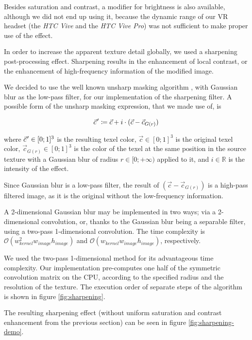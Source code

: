 Besides saturation and contrast, a modifier for brightness is also available, although we did not end up using it, because the dynamic range of our \ac{VR} headset (the \textit{HTC Vive} and the \textit{HTC Vive Pro}) was not sufficient to make proper use of the effect.

In order to increase the apparent texture detail globally, we used a sharpening post-processing effect. Sharpening results in the enhancement of local contrast, or the enhancement of high-frequency information of the modified image.

We decided to use the well known unsharp masking algorithm \autocite{jain1989fundamentals}, with Gaussian blur as the low-pass filter, for our implementation of the sharpening filter. A possible form of the unsharp masking expression, that we made use of, is

\begin{equation}\label{eq:unsharpmask}
    \pvec{c}' \coloneqq \vec{c} + i \cdot (\vec{c} - \vec{c}_{G(r)})
\end{equation}

where $\pvec{c}' \in [0; 1]^3$ is the resulting texel color, $\vec{c} \in [0; 1]^3$ is the original texel color, $\vec{c}_{G(r)} \in [0; 1]^3$ is the color of the texel at the same position in the source texture with a Gaussian blur of radius $r \in [0; +\infty)$ applied to it, and $i \in \mathbb{R}$ is the intensity of the effect.

Since Gaussian blur is a low-pass filter, the result of $(\vec{c} - \vec{c}_{G(r)})$ is a high-pass filtered image, as it is the original without the low-frequency information.

A 2-dimensional Gaussian blur may be implemented in two ways; via a 2-dimensional convolution, or, thanks to the Gaussian blur being a separable filter, using a two-pass 1-dimensional convolution. The time complexity is $\mathcal{O}(w_{kernel}^2w_{image}h_{image})$ and $\mathcal{O}(w_{kernel} \allowbreak w_{image}h_{image})$, respectively.

We used the two-pass 1-dimensional method for its advantageous time complexity. Our implementation pre-computes one half of the symmetric convolution matrix on the CPU, according to the specified radius and the resolution of the texture. The execution order of separate steps of the algorithm is shown in figure \ref{fig:sharpening}.

The resulting sharpening effect (without uniform saturation and contrast enhancement from the previous section) can be seen in figure \ref{fig:sharpening-demo}.

